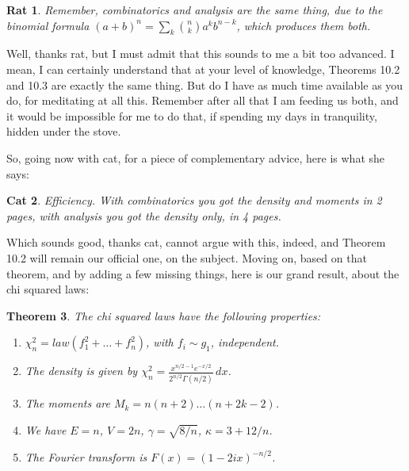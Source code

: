 \documentclass[12pt]{amsbook}
\newtheorem{theorem}{Theorem}[chapter]
\newtheorem{cat}[theorem]{Cat}
\newtheorem{rat}[theorem]{Rat}
\begin{document}
\begin{rat}
Remember, combinatorics and analysis are the same thing, due to the binomial formula $(a+b)^n=\sum_k\binom{n}{k}a^kb^{n-k}$, which produces them both.
\end{rat}

Well, thanks rat, but I must admit that this sounds to me a bit too advanced. I mean, I can certainly understand that at your level of knowledge, Theorems 10.2 and 10.3 are exactly the same thing. But do I have as much time available as you do, for meditating at all this. Remember after all that I am feeding us both, and it would be impossible for me to do that, if spending my days in tranquility, hidden under the stove.

\bigskip

So, going now with cat, for a piece of complementary advice, here is what she says:

\begin{cat}
Efficiency. With combinatorics you got the density and moments in 2 pages, with analysis you got the density only, in 4 pages.
\end{cat}

Which sounds good, thanks cat, cannot argue with this, indeed, and Theorem 10.2 will remain our official one, on the subject. Moving on, based on that theorem, and by adding a few missing things, here is our grand result, about the chi squared laws:

\begin{theorem}
The chi squared laws have the following properties: 
\begin{enumerate}
\item $\chi_n^2=law(f_1^2+\ldots+f_n^2)$, with $f_i\sim g_1$, independent.

\item The density is given by $\chi_n^2=\frac{x^{n/2-1}e^{-x/2}}{2^{n/2}\Gamma(n/2)}\,dx$.

\item The moments are $M_k=n(n+2)\ldots(n+2k-2)$.

\item We have $E=n$, $V=2n$, $\gamma=\sqrt{8/n}$, $\kappa=3+12/n$.

\item The Fourier transform is $F(x)=(1-2ix)^{-n/2}$.
\end{enumerate}
\end{theorem}
\end{document}
